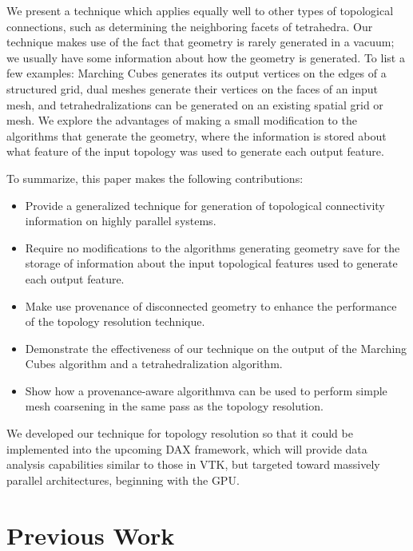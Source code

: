 \documentclass[10pt,journal,cspaper,compsoc]{IEEEtran}
\begin{document}
We present a technique which applies equally well to other types of topological 
connections, such as determining the neighboring facets of tetrahedra. Our technique makes use of the fact that geometry is rarely generated in a vacuum; we usually have some information about how the geometry is generated. To list a few examples: Marching Cubes generates its output vertices on the edges of a structured grid, dual meshes generate their vertices on the faces of an input mesh, and tetrahedralizations can be generated on an existing spatial grid or mesh. We explore the advantages of making a small modification to the algorithms that generate the geometry, where the information is stored about what feature of the input topology was used to generate each output feature. 

To summarize, this paper makes the following contributions:
\begin{itemize}
	\item{Provide a generalized technique for generation of topological connectivity information on highly parallel systems.}
	\item{Require no modifications to the algorithms generating geometry save for the
		storage of information about the input topological features used to generate each output feature.}

	\item{Make use provenance of disconnected geometry to enhance the performance of the topology
		resolution technique.}

	\item{Demonstrate the effectiveness of our technique on the output of the Marching Cubes
		algorithm and a tetrahedralization algorithm.}
 
	\item{Show how a provenance-aware algorithmva can be used to perform
		 simple mesh coarsening in the same pass as the topology resolution.}
 
\end{itemize}

We developed our technique for topology resolution so that it could be implemented
into the upcoming DAX framework, which will provide data analysis capabilities similar to those
in VTK, but targeted toward massively parallel architectures, beginning with the GPU.

\section{Previous Work}
\end{document}
